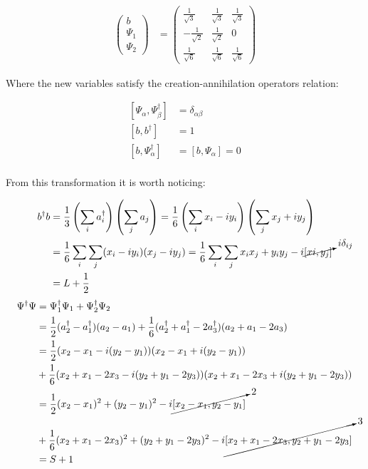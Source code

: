 \begin{align*}
\begin{pmatrix} b \\ \Psi_1 \\ \Psi_2 \end{pmatrix} &= 
\begin{pmatrix}\frac{1}{\sqrt{3}} &\frac{1}{\sqrt{3}}&\frac{1}{\sqrt{3}}\\
				-\frac{1}{\sqrt{2}}&\frac{1}{\sqrt{2}}&0\\
				\frac{1}{\sqrt{6}}&\frac{1}{\sqrt{6}}&\frac{1}{\sqrt{6}}\end{pmatrix}
\end{align*}

Where the new variables satisfy the creation-annihilation operators relation:

\begin{align*}
\left[ \Psi_\alpha,\Psi_\beta^\dagger\right] &= \delta_{\alpha\beta}\\
\left[ b,b^\dagger\right] &= 1\\
\left[ b,\Psi_\alpha^\dagger\right] &=\left[ b,\Psi_\alpha\right] = 0\\
\end{align*}

From this transformation it is worth noticing:

\begin{align*}
b^\dagger b &= \frac{1}{3}\left( \sum_i a_i^\dagger \right)\left( \sum_j a_j \right) =  \frac{1}{6}\left( \sum_i x_i-iy_i \right)\left( \sum_j x_j+iy_j \right)\\
&= \frac{1}{6}\sum_i\sum_j(x_i-iy_i)(x_j-iy_j) = \frac{1}{6}\sum_i\sum_jx_ix_j+y_iy_j -i\cancelto{i\delta_{ij}}{[xi,y_j]}\\
&= L + \frac{1}{2}\\
\end{align*}
\small
\begin{align*}
\Psi^\dagger\Psi &= \Psi_1^\dagger\Psi_1 +\Psi_2^\dagger\Psi_2\\
&= \frac{1}{2} (a_2^\dagger-a_1^\dagger)(a_2-a_1) + \frac{1}{6}(a_2^\dagger+a_1^\dagger-2a_3^\dagger)(a_2+a_1-2a_3)\\
&= \frac{1}{2} (x_2-x_1 -i(y_2-y_1))(x_2-x_1 +i(y_2-y_1))\\
&+\frac{1}{6}(x_2+x_1-2x_3-i(y_2+y_1-2y_3))(x_2+x_1-2x_3 +i(y_2+y_1-2y_3))\\
&= \frac{1}{2} (x_2-x_1)^2+(y_2-y_1)^2-i\cancelto{2}{[x_2-x_1,y_2-y_1]} \\
&+ \frac{1}{6} (x_2+x_1-2x_3)^2+(y_2+y_1-2y_3)^2-i\cancelto{3}{[x_2+x_1-2x_3,y_2+y_1-2y_3]}\\
&= S+1
\end{align*}
\normalsize


